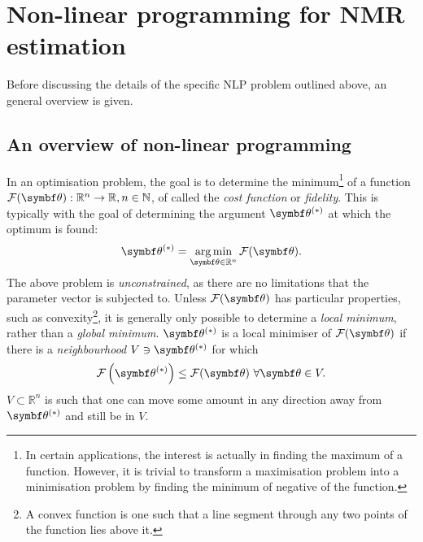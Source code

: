 \section{Non-linear programming for NMR estimation}
Before discussing the details of the specific \ac{NLP} problem outlined above,
an general overview is given.

\subsection{An overview of non-linear programming}
\label{subsec:nlp-overview}
In an optimisation problem, the goal is to determine the minimum\footnote{
    In certain applications, the interest is actually in finding the maximum of
    a function. However, it is trivial to transform a maximisation problem into
    a minimisation problem by finding the minimum of negative of the function.
}
of a function $\Fth: \mathbb{R}^n \rightarrow \mathbb{R}, n \in \mathbb{N}$, of
called the \emph{cost function} or \emph{fidelity}.
This is typically with the goal of determining the argument $\bthstar$ at
which the optimum is found:
\begin{equation}
    \bthstar = \argmin_{\bth \in \mathbb{R}^n} \Fth.
    \label{eq:minF}
\end{equation}
The above problem is \emph{unconstrained}, as there are no limitations that the
parameter vector is subjected to. Unless $\Fth$ has particular properties, such
as convexity\footnote{
    A convex function is one such that a line segment through any two points of
    the function lies above it.
}, it is generally only possible to determine a \emph{local minimum},
rather than a \emph{global minimum}. $\bthstar$ is a local
minimiser of $\Fth$ if there is a \emph{neighbourhood} $V \ni \bthstar$ for which
\begin{equation}
    \Fthstar \leq \Fth\ \forall \bth \in V.
  \label{def:local-minimiser}
\end{equation}
$V \subset \mathbb{R}^n$ is such that one can move some amount in any direction
away from $\bthstar$ and still be in $V$.

